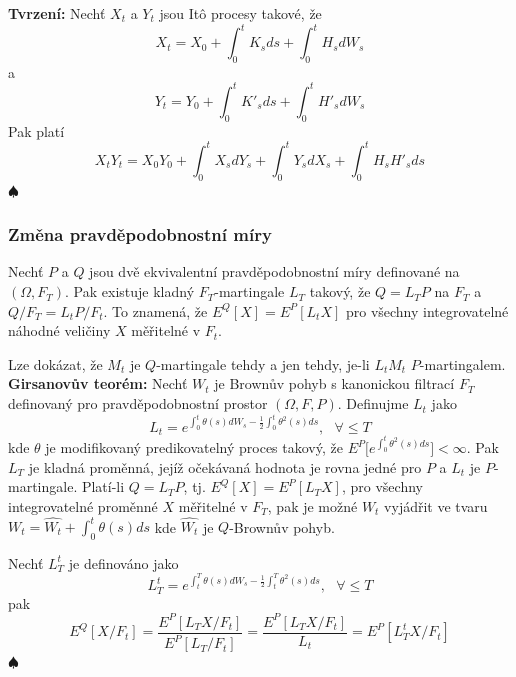 \documentclass[a4paper]{book}
\begin{document}
\noindent \textbf{Tvrzení:} Nechť $X_t$ a $Y_t$ jsou It\^o procesy takové, že 
\begin{equation*}
X_t = X_0 + \int_0^t K_s ds + \int_0^t H_s d W_s
\end{equation*}
a
\begin{equation*}
Y_t = Y_0 + \int_0^t K'_s ds + \int_0^t H'_s d W_s
\end{equation*}
Pak platí
\begin{equation*}
X_t Y_t = X_0Y_0 + \int_0^t X_s dY_s + \int_0^t Y_s dX_s + \int_0^t H_s H'_s ds
\end{equation*}
$\spadesuit$\\

\subsubsection{Změna pravděpodobnostní míry}

Nechť $P$ a $Q$ jsou dvě ekvivalentní pravděpodobnostní míry definované na $(\Omega, F_T)$. Pak existuje kladný $F_T$-martingale $L_T$ takový, že $Q = L_T P$ na $F_T$ a $Q/F_T = L_tP/F_t$. To znamená, že $E^Q[X] = E^P[L_tX]$ pro všechny integrovatelné náhodné veličiny $X$ měřitelné v $F_t$.

Lze dokázat, že $M_t$ je $Q$-martingale tehdy a jen tehdy, je-li $L_t M_t$ $P$-martingalem.\\

\noindent \textbf{Girsanovův teorém:} Nechť $W_t$ je Brownův pohyb s kanonickou filtrací $F_T$ definovaný pro pravděpodobnostní prostor $(\Omega, F, P)$. Definujme $L_t$ jako
\begin{equation*}
L_t = e^{\int_0^t \theta(s)dW_s - \frac{1}{2}\int_0^t \theta^2(s)ds}, ~~~ \forall \le T
\end{equation*}
kde $\theta$ je modifikovaný predikovatelný proces takový, že $E^P \Big[e^{\int_0^t \theta^2(s)ds} \Big] < \infty$. Pak $L_T$ je kladná proměnná, jejíž očekávaná hodnota je rovna jedné pro $P$ a $L_t$ je $P$-martingale. Platí-li $Q=L_TP$, tj. $E^Q[X] = E^P[L_T X]$, pro všechny integrovatelné proměnné $X$ měřitelné v $F_T$, pak je možné $W_t$ vyjádřit ve tvaru $W_t = \hat{W_t} + \int_0^t \theta(s)ds$ kde $\hat{W_t}$ je $Q$-Brownův pohyb.

Nechť $L_T^t$ je definováno jako
\begin{equation*}
L_T^t = e^{\int_t^T \theta(s)dW_s - \frac{1}{2}\int_t^T \theta^2(s)ds}, ~~~ \forall \le T
\end{equation*}
pak
\begin{equation*}
E^Q[X/F_t] = \frac{E^P[L_TX/F_t]}{E^P[L_T/F_t]} = \frac{E^P[L_TX/F_t]}{L_t} = E^P[L_T^tX/F_t]
\end{equation*}
$\spadesuit$\\
\end{document}
